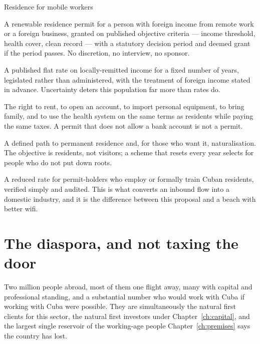 \begin{design}{Residence for mobile workers}
\label{d:residence}
\begin{rules}
 A renewable residence permit for a person with foreign income
from remote work or a foreign business, granted on published objective criteria
--- income threshold, health cover, clean record --- with a statutory decision
period and deemed grant if the period passes. No discretion, no interview, no
sponsor.

 A published flat rate on locally-remitted income for a
fixed number of years, legislated rather than administered, with the treatment
of foreign income stated in advance. Uncertainty deters this population far more
than rates do.

 The right to rent, to open an account, to import personal
equipment, to bring family, and to use the health system on the same terms as
residents while paying the same taxes. A permit that does not allow a bank
account is not a permit.

 A defined path to permanent residence and, for those
who want it, naturalisation. The objective is residents, not visitors; a scheme
that resets every year selects for people who do not put down roots.

 A reduced rate for permit-holders who employ or formally
train Cuban residents, verified simply and audited. This is what converts an
inbound flow into a domestic industry, and it is the difference between this
proposal and a beach with better wifi.
\end{rules}
\end{design}

\section{The diaspora, and not taxing the door}

Two million people abroad, most of them one flight away, many with capital and
professional standing, and a substantial number who would work with Cuba if
working with Cuba were possible. They are simultaneously the natural first
clients for this sector, the natural first investors under
Chapter~\ref{ch:capital}, and the largest single reservoir of the working-age
people Chapter~\ref{ch:premises} says the country has lost.

